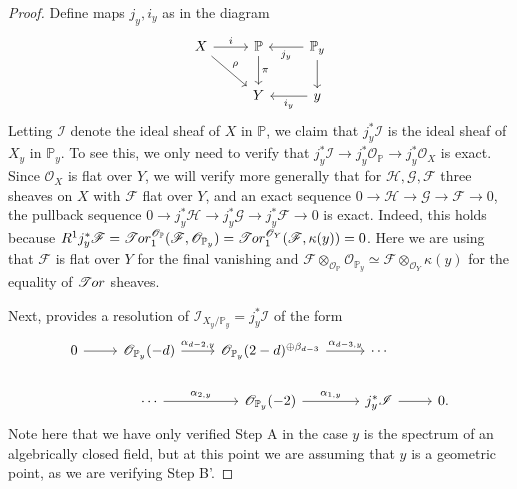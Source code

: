 \documentclass[12 pt]{amsart}
\newcommand{\rboxed}[1]{#1}
\theoremstyle{plain}
\theoremstyle{definition}
\theoremstyle{remark}
\numberwithin{equation}{section}
\newcommand\bp{\mathbb P}
\newcommand\scf{\mathscr F}
\newcommand\scg{\mathscr G}
\newcommand\sch{\mathscr H}
\newcommand\sci{\mathscr I}
\newcommand\sco{\mathscr O}
\newcommand \ra{\rightarrow}
\newcommand*{\stor}{\mathscr{T}\kern -.5pt or}
\begin{document}
\begin{proof}
	Define maps $j_y, i_y$ as in the diagram \begin{equation}
	\label{equation:} \begin{tikzcd} X \ar {r}{i} \ar {rd}{\rho} & \bp \ar
{d}{\pi} & \bp_y \ar {l}{j_y} \ar{d} \\ & Y & y \ar{l}{i_y}
\end{tikzcd}\end{equation} Letting $\rboxed{\sci}$ denote the ideal sheaf
of $X$ in $\bp$, we claim that $j_y^*\sci$ is the ideal sheaf of $X_y$ in
$\bp_y$.  To see this, we only need to verify that $j_y^* \sci \ra j_y^*
\sco_{\bp} \ra j_y^* \sco_X$ is exact.  Since $\sco_X$ is flat over $Y$, we will
verify more generally that for $\sch, \scg, \scf$ three sheaves on $X$ with
$\scf$ flat over $Y$, and an exact sequence $0 \ra\sch \ra \scg \ra \scf \ra 0$,
the pullback sequence $0 \ra j_y^* \sch \ra j_y^* \scg \ra j_y^* \scf \ra 0$ is
exact.  Indeed,
this holds because $R^1 j_y^* \scf = \stor_1^{\sco_\bp}(\scf, \sco_{\bp_y}) =
\stor_1^{\sco_Y}(\scf, \kappa(y)) = 0$.  Here we are using that $\scf$ is flat
over $Y$ for the final vanishing and $\scf \otimes_{\sco_\bp} \sco_{\bp_y}
\simeq \scf \otimes_{\sco_Y} \kappa(y)$ for the equality of $\stor$ sheaves.
	
	Next, \cite[Step A, p. 443]{casnatiE:covers-algebraic-varieties}
	provides a resolution of $\sci_{X_y/ \bp_y} = j_y^*\sci$ of the form
	\begin{equation} \label{equation:ideal-sheaf-fiber} \begin{tikzcd} 0 \ar
			{r} & \sco_{\bp_y}(-d) \ar {r}{\alpha_{d-2,y}} &
			\sco_{\bp_y}(2-d)^{\oplus \beta_{d-3}} \ar
			{r}{\alpha_{d-3,y}} & \cdots \\
			& \cdots \ar {r}{\alpha_{2,y}} &
			\sco_{\bp_y}(-2) \ar{r}{\alpha_{1,y}} & j_y^* \sci
			\ar{r}&  0.  \end{tikzcd}\end{equation} 
	Note here that we have only verified Step A in the case $y$ is the
	spectrum of an algebrically closed field, but at this point we are
	assuming that $y$ is a geometric point, as we are verifying Step B'.
	

\end{proof}
\end{document}
